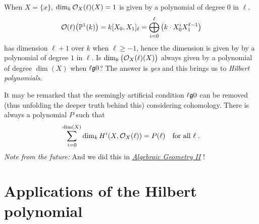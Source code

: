 \documentclass[a4paper,parskip=half,numbers=enddot, DIV=12, headheight=30pt]{scrreprt}
\begin{document}
\begin{rem*}
    When $X=\{x\}$, $\dim_k \mathcal{O}_X(\ell)(X) = 1$ is given by a polynomial of degree $0$ in $\ell$. 
    \begin{align*}
        \mathcal{O}(\ell)\big(\mathbb{P}^1(k)\big) = k[X_0,X_1]_\ell=\bigoplus_{i=0}^\ell \left(k\cdot X_0^iX_1^{\ell-1}\right)
    \end{align*}
    has dimension $\ell+1$ over $k$ when $\ell\geq -1$, hence the dimension is given by by a polynomial of degree $1$ in $\ell$. Is $\dim_k\big(\mathcal{O}_X(\ell)(X)\big)$ always given by a polynomial of degree $\dim(X)$ when $\ell \gge 0$? The answer is \emph{yes} and this brings us to \emph{Hilbert polynomials}.
    
    It may be remarked that the seemingly artificial condition $\ell\gge0$ can be removed (thus unfolding the deeper truth behind this) considering cohomology. There is always a polynomial $P$ such that 
    \begin{align*}
	    \sum_{i=0}^{\dim (X)} \dim_kH^i(X,\mathcal{O}_X(\ell)) = P(\ell)\quad\text{for all }\ell\;.
    \end{align*}
    \emph{Note from the future:} And we did this in \href{https://github.com/Nicholas42/AlgebraFranke/blob/master/AlgGeoI}{\emph{Algebraic Geometry II}} \cite[Proposition~2.2.4]{alggeo2}!
\end{rem*}



\chapter{Applications of the Hilbert polynomial}
\end{document}
